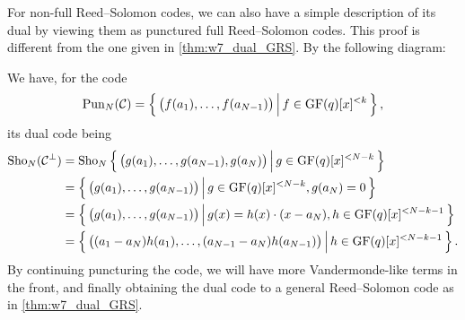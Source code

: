 \begin{example}
    For non-full Reed--Solomon codes, we can also have a simple description of its dual by viewing them as punctured full Reed--Solomon codes. This proof is different from the one given in \autoref{thm:w7_dual_GRS}. By the following diagram:
    \begin{center}
    \end{center}
    We have, for the code
    \begin{equation*}
        \mathrm{Pun}_N(\mathcal{C}) = \left\{\,{\left(f(a_1),\ldots,f(a_{N-1})\right)}\,\middle\vert\,{f\in\mathrm{GF}(q)[x]^{<k}}\,\right\},
    \end{equation*}
    its dual code being
    \begin{align*}
        \mathrm{Sho}_N(\mathcal{C}^\perp) &= \mathrm{Sho}_N \left\{\,{\left(g(a_1),\ldots,g(a_{N-1}),g(a_N)\right)}\,\middle\vert\,{g\in\mathrm{GF}(q)[x]^{<N-k}}\,\right\} \\
        &= \left\{\,{\left(g(a_1),\ldots,g(a_{N-1})\right)}\,\middle\vert\,{g\in\mathrm{GF}(q)[x]^{<N-k}, g(a_N)=0}\,\right\} \\
        &= \left\{\,{\left(g(a_1),\ldots,g(a_{N-1})\right)}\,\middle\vert\,{g(x)=h(x)\cdot(x-a_N), h\in\mathrm{GF}(q)[x]^{< N-k-1}}\,\right\} \\
        &= \left\{\,{\left((a_1-a_N)h(a_1),\ldots,(a_{N-1}-a_N)h(a_{N-1})\right)}\,\middle\vert\,{h\in\mathrm{GF}(q)[x]^{< N-k-1}}\,\right\}.
    \end{align*}
    By continuing puncturing the code, we will have more Vandermonde-like terms in the front, and finally obtaining the dual code to a general Reed--Solomon code as in \autoref{thm:w7_dual_GRS}.
\end{example}